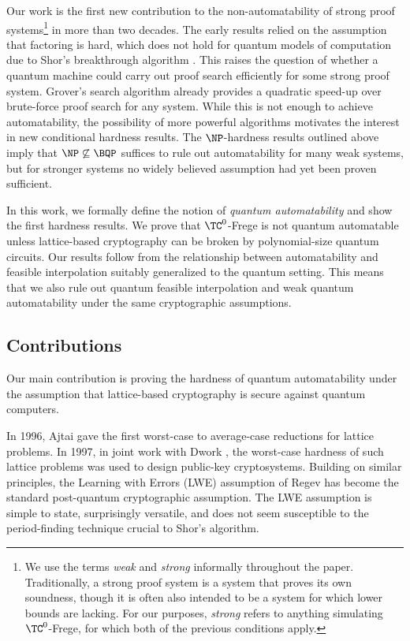 \documentclass[11pt]{article}
\theoremstyle{definition}
\theoremstyle{plain}
\theoremstyle{remark}
\begin{document}
Our work is the first new contribution to the non-automatability of strong proof systems\footnote{We use the terms \emph{weak} and \emph{strong} informally throughout the paper. Traditionally, a strong proof system is a system that proves its own soundness, though it is often also intended to be a system for which lower bounds are lacking. For our purposes, \emph{strong} refers to anything simulating $\TC^0$-Frege, for which both of the previous conditions apply.} in more than two decades. The early results \cite{KP98, BPR1997, BDGMP04} relied on the assumption that factoring is hard, which does not hold for quantum models of computation due to Shor's breakthrough algorithm \cite{shor}. This raises the question of whether a quantum machine could carry out proof search efficiently for some strong proof system. Grover's search algorithm \cite{grover} already provides a quadratic speed-up over brute-force proof search for any system. While this is not enough to achieve automatability, the possibility of more powerful algorithms motivates the interest in new conditional hardness results. The $\NP$-hardness results outlined above imply that $\NP \not\subseteq \BQP$ suffices to rule out automatability for many weak systems, but for stronger systems no widely believed assumption had yet been proven sufficient.

In this work, we formally define the notion of \emph{quantum automatability} and show the first hardness results. We prove that $\TC^0$-Frege is not quantum automatable unless lattice-based cryptography can be broken by polynomial-size quantum circuits. Our results follow from the relationship between automatability and feasible interpolation suitably generalized to the quantum setting. This means that we also rule out quantum feasible interpolation and weak quantum automatability under the same cryptographic assumptions.

\subsection*{Contributions}
Our main contribution is proving the hardness of quantum automatability under the assumption that lattice-based cryptography is secure against quantum computers.

In 1996, Ajtai \cite{ajtai1996generating} gave the first worst-case to average-case reductions for lattice problems. In 1997, in joint work with Dwork \cite{ajtai1997public}, the worst-case hardness of such lattice problems was used to design public-key cryptosystems. Building on similar principles, the Learning with Errors (LWE) assumption of Regev \cite{regev2009lattices} has become the standard post-quantum cryptographic assumption. The LWE assumption is simple to state, surprisingly versatile, and does not seem susceptible to the period-finding technique crucial to Shor's algorithm.
\end{document}
